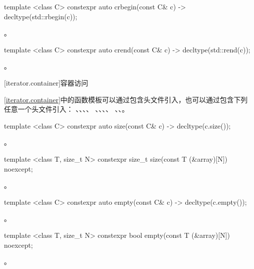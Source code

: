 %
\begin{itemdecl}
template <class C> constexpr auto crbegin(const C& c) -> decltype(std::rbegin(c));
\end{itemdecl}
\begin{itemdescr}
\pnum \returns {}。
\end{itemdescr}

%
\begin{itemdecl}
template <class C> constexpr auto crend(const C& c) -> decltype(std::rend(c));
\end{itemdecl}
\begin{itemdescr}
\pnum \returns {}。
\end{itemdescr}

[iterator.container]{容器访问}

\pnum
\ref{iterator.container}中的函数模板可以通过包含头文件引入，也可以通过包含下列任意一个头文件引入：
、、、、
、、、、
、、。

\begin{itemdecl}
template <class C> constexpr auto size(const C& c) -> decltype(c.size());
\end{itemdecl}
\begin{itemdescr}
\pnum \returns {}。
\end{itemdescr}

\begin{itemdecl}
template <class T, size_t N> constexpr size_t size(const T (&array)[N]) noexcept;
\end{itemdecl}
\begin{itemdescr}
\pnum \returns {}。
\end{itemdescr}

\begin{itemdecl}
template <class C> constexpr auto empty(const C& c) -> decltype(c.empty());
\end{itemdecl}
\begin{itemdescr}
\pnum \returns {}。
\end{itemdescr}

\begin{itemdecl}
template <class T, size_t N> constexpr bool empty(const T (&array)[N]) noexcept;
\end{itemdecl}
\begin{itemdescr}
\pnum \returns {}。
\end{itemdescr}

